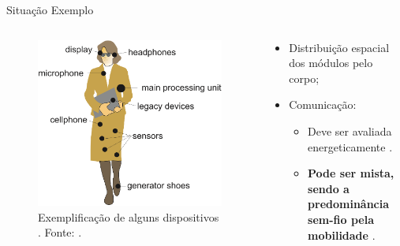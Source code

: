       \begin{frame}{\Wearables}{Situação Exemplo} \vspace{-1em}
         \begin{columns}
            \begin{column}{0.6\textwidth}
               \begin{figure}[h] \centering
                  \includegraphics[width=1\textwidth]{img/into-wearable2.png}
                  \caption{Exemplificação de alguns dispositivos \wearables. Fonte: \cite{Plessl2003}.}
                  \label{fig:into-wearable}
               \end{figure}
            \end{column}
            \begin{column}{0.4\textwidth}
               \begin{itemize}
                   \setlength{\itemsep}{1.0em}
                  \item Distribuição espacial dos módulos pelo corpo;
                  
                  \item Comunicação:
                  \begin{itemize}
                     \setlength{\itemsep}{0.5em}
                     \item Deve ser avaliada energeticamente \cite{Kymissis1998}.
                     \item \textbf{Pode ser mista, sendo a predominância sem-fio pela mobilidade} \cite{Plessl2003}.
                  \end{itemize}
               \end{itemize}
               
            \end{column}
         \end{columns}
         
      \end{frame}
      
